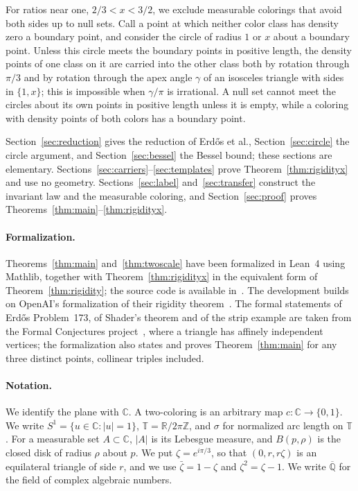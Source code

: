 \documentclass[10pt]{article}
\theoremstyle{remark}
\newcommand{\C}{\mathbb C}
\newcommand{\R}{\mathbb R}
\newcommand{\Z}{\mathbb Z}
\newcommand{\T}{\mathbb T}
\newcommand{\Qbar}{\overline{\mathbb Q}}
\begin{document}
For ratios near one, $2/3<x<3/2$, we exclude measurable colorings that avoid both sides up to null sets. Call a point at which neither color class has density zero a boundary point, and consider the circle of radius $1$ or $x$ about a boundary point. Unless this circle meets the boundary points in positive length, the density points of one class on it are carried into the other class both by rotation through $\pi/3$ and by rotation through the apex angle $\gamma$ of an isosceles triangle with sides in $\{1,x\}$; this is impossible when $\gamma/\pi$ is irrational. A null set cannot meet the circles about its own points in positive length unless it is empty, while a coloring with density points of both colors has a boundary point.

Section~\ref{sec:reduction} gives the reduction of Erd\H{o}s et al., Section~\ref{sec:circle} the circle argument, and Section~\ref{sec:bessel} the Bessel bound; these sections are elementary. Sections~\ref{sec:carriers}--\ref{sec:templates} prove Theorem~\ref{thm:rigidityx} and use no geometry. Sections~\ref{sec:label} and~\ref{sec:transfer} construct the invariant law and the measurable coloring, and Section~\ref{sec:proof} proves Theorems~\ref{thm:main}--\ref{thm:rigidityx}.

\paragraph{Formalization.} Theorems~\ref{thm:main} and~\ref{thm:twoscale} have been formalized in Lean~4 using Mathlib, together with Theorem~\ref{thm:rigidityx} in the equivalent form of Theorem~\ref{thm:rigidity}; the source code is available in~\cite{Formalization}. The development builds on OpenAI's formalization of their rigidity theorem~\cite{OAICode}. The formal statements of Erd\H{o}s Problem~173, of Shader's theorem and of the strip example are taken from the Formal Conjectures project~\cite{FormalConjectures}, where a triangle has affinely independent vertices; the formalization also states and proves Theorem~\ref{thm:main} for any three distinct points, collinear triples included.

\paragraph{Notation.} We identify the plane with $\C$. A two-coloring is an arbitrary map $c\colon\C\to\{0,1\}$. We write $S^1=\{u\in\C:|u|=1\}$, $\T=\R/2\pi\Z$, and $\sigma$ for normalized arc length on $\T$. For a measurable set $A\subset\C$, $|A|$ is its Lebesgue measure, and $B(p,\rho)$ is the closed disk of radius $\rho$ about $p$. We put $\zeta=e^{i\pi/3}$, so that $(0,r,r\zeta)$ is an equilateral triangle of side $r$, and we use $\bar\zeta=1-\zeta$ and $\zeta^2=\zeta-1$. We write $\Qbar$ for the field of complex algebraic numbers.
\end{document}
